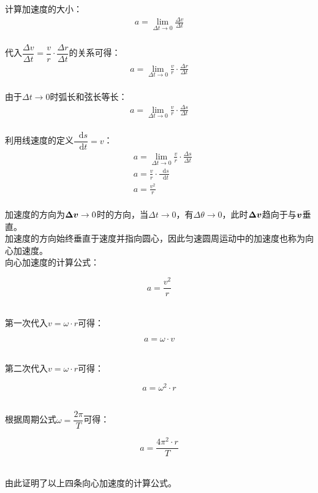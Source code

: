 \documentclass[UTF8]{ctexart}
\newcommand*{\veb}[1]{\vb*{#1}}
\newcommand*{\dif}{\mathop{}\!\mathrm{d}}
\begin{document}
    计算加速度的大小：
    \begin{align}
        a=\lim_{\Delta t\rightarrow 0}\frac{\Delta v}{\Delta t}
    \end{align}\\
    代入$\dfrac{\Delta v}{\Delta t}=\dfrac{v}{r}\cdot\dfrac{\Delta r}{\Delta t}$\hspace{6pt}的关系可得：
    \begin{align}
        a=\lim_{\Delta t\rightarrow 0}\frac{v}{r}\cdot\frac{\Delta r}{\Delta t}
    \end{align}\\
    由于$\Delta t\rightarrow 0$时弧长和弦长等长：
    \begin{align}
        a=\lim_{\Delta t\rightarrow 0}\frac{v}{r}\cdot\frac{\Delta s}{\Delta t}
    \end{align}\\
    利用线速度的定义$\dfrac{\dif s}{\dif t}=v$：
    \begin{align}
        &a=\lim_{\Delta t\rightarrow 0}\frac{v}{r}\cdot\frac{\Delta s}{\Delta t}\\[5mm]
        &a=\frac{v}{r}\cdot\frac{\dif s}{\dif t}\\[5mm]
        &a=\frac{v^2}{r}        
    \end{align}\\
    加速度的方向为$\veb{\Delta v}\rightarrow 0$时的方向，当$\Delta t\rightarrow 0$，有$\Delta\theta\rightarrow 0$，此时$\veb{\Delta v}$趋向于与$\veb{v}$垂直。\\[3mm]
    加速度的方向始终垂直于速度并指向圆心，因此匀速圆周运动中的加速度也称为向心加速度。\\[5mm]
    向心加速度的计算公式：
    \begin{large}
        \begin{equation*}
            a=\frac{v^2}{r}    
        \end{equation*}
    \end{large}\\
    第一次代入$v=\omega\cdot r$可得：
    \begin{large}
        \begin{equation*}
            a=\omega\cdot v
        \end{equation*}
    \end{large}\\
    第二次代入$v=\omega\cdot r$可得：
    \begin{large}
        \begin{equation*}
            a=\omega^2\cdot r
        \end{equation*}
    \end{large}\\
    根据周期公式$\omega=\dfrac{2\pi}{T}$可得：
    \begin{large}
        \begin{equation*}
            a=\frac{4\pi^2\cdot r}{T}
        \end{equation*}
    \end{large}\\
    由此证明了以上四条向心加速度的计算公式。
\end{document}
